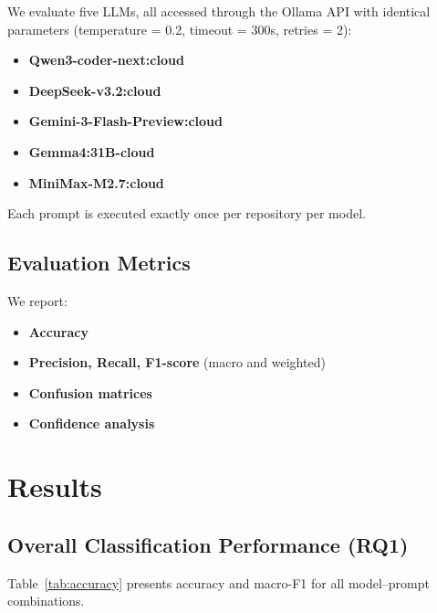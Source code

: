 \documentclass[runningheads]{llncs}
\begin{document}
We evaluate five LLMs, all accessed through the Ollama API with identical parameters (temperature = 0.2, timeout = 300s, retries = 2):

\begin{itemize}[nosep]
    \item \textbf{Qwen3-coder-next:cloud}
    \item \textbf{DeepSeek-v3.2:cloud}
    \item \textbf{Gemini-3-Flash-Preview:cloud}
    \item \textbf{Gemma4:31B-cloud}
    \item \textbf{MiniMax-M2.7:cloud}
\end{itemize}

Each prompt is executed exactly once per repository per model.

\subsection{Evaluation Metrics}

We report:

\begin{itemize}[nosep]
    \item \textbf{Accuracy}
    \item \textbf{Precision, Recall, F1-score} (macro and weighted)
    \item \textbf{Confusion matrices}
    \item \textbf{Confidence analysis}
\end{itemize}

\section{Results}
\label{sec:results}

\subsection{Overall Classification Performance (RQ1)}

Table~\ref{tab:accuracy} presents accuracy and macro-F1 for all model--prompt combinations.
\end{document}
